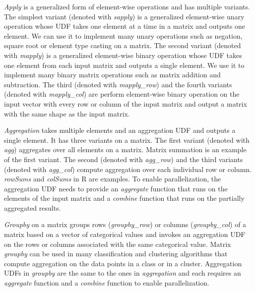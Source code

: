 \textit{Apply} is a generalized form of element-wise operations and has
multiple variants. The simplest variant (denoted with \textit{sapply}) is
a generalized element-wise unary operation whose UDF takes one element at a time
in a matrix and outputs one element. We can use it to implement many unary
operations such as negation, square root or element type casting
on a matrix. The second variant (denoted with \textit{mapply}) is a generalized
element-wise binary operation whose UDF takes one element from each input
matrix and outputs a single element. We use it to implement many binary
matrix operations such as matrix addition and subtraction. The third
(denoted with \textit{mapply\_row}) and the fourth variants (denoted with
\textit{mapply\_col}) are perform element-wise
binary operation on the input vector with every row or column of the input
matrix and output a matrix with the same shape as the input matrix.

\textit{Aggregation} takes multiple elements and an aggregation UDF and outputs
a single element. It has three variants on a matrix.
The first variant (denoted with \textit{agg}) aggregates over all elements on a matrix.
Matrix summation is an example of the first variant. The second (denoted with
\textit{agg\_row}) and the third variants (denoted with \textit{agg\_col})
compute aggregation over each individual row or column. \textit{rowSums}
and \textit{colSums} in R are examples. To enable parallelization,
the aggregation UDF needs to provide an \textit{aggregate} function that runs
on the elements of the input matrix and a \textit{combine} function that runs
on the partially aggregated results.

\textit{Groupby} on a matrix groups rows (\textit{groupby\_row}) or columns
(\textit{groupby\_col}) of a matrix based on a vector of categorical values
and invokes an aggregation UDF on the rows or
columns associated with the same categorical value. Matrix \textit{groupby}
can be used in many classification and clustering algorithms that compute
aggregation on the data points in a class or in a cluster. Aggregation UDFs
in \textit{groupby} are the same to the ones in \textit{aggregation} and
each requires an \textit{aggregate} function and a \textit{combine} function
to enable parallelization.

